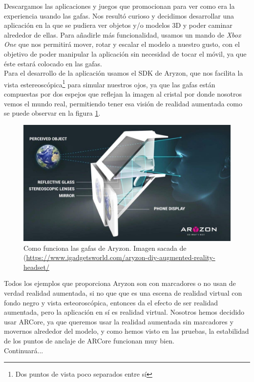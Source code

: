 Descargamos las aplicaciones y juegos que promocionan para ver como era la experiencia usando las gafas. Nos resultó curioso y decidimos desarrollar una aplicación en la que se pudiera ver objetos y/o modelos 3D y poder caminar alrededor de ellas. Para añadirle más funcionalidad, usamos un mando de \textit{Xbox One} que nos permitirá mover, rotar y escalar el modelo a nuestro gusto, con el objetivo de poder manipular la aplicación sin necesidad de tocar el móvil, ya que éste estará colocado en las gafas.\\

Para el desarrollo de la aplicación usamos el SDK de Aryzon, que nos facilita la vista estereoscópica\footnote{ Dos puntos de vista poco separados entre sí} para simular nuestros ojos, ya que las gafas están compuestas por dos espejos que reflejan la imagen al cristal por donde nosotros vemos el mundo real, permitiendo tener esa visión de realidad aumentada como se puede observar en la figura \ref{GafasAryzon}.

\begin{figure}[H]
    \centering
    \includegraphics[width=0.5\linewidth]{Images/How-it-works.jpg}
    \caption{Como funciona las gafas de Aryzon. Imagen sacada de (\url{https://www.igadgetsworld.com/aryzon-diy-augmented-reality-headset/}}
    \label{GafasAryzon}
\end{figure}


Todos los ejemplos que proporciona Aryzon son con marcadores o no usan de verdad realidad aumentada, si no que que es una escena de realidad virtual con fondo negro y vista esteoroscópica, entonces da el efecto de ser realidad aumentada, pero la aplicación en sí es realidad virtual. Nosotros hemos decidido usar ARCore, ya que queremos usar la realidad aumentada sin marcadores y movernos alrededor del modelo, y como hemos visto en las pruebas, la estabilidad de los puntos de anclaje de ARCore funcionan muy bien.\\
Continuará...

\noindent